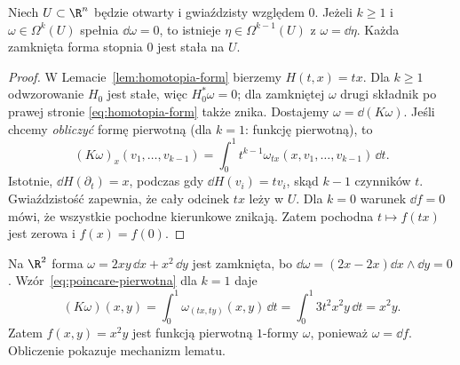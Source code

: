 \begin{twierdzenie}
\label{thm:lemat-poincare-formy}
Niech $U\subset\R^n$ będzie otwarty i gwiaździsty
względem $0$. Jeżeli $k\geq1$ i
$\omega\in\Omega^k(U)$ spełnia $\dd\omega=0$,
to istnieje $\eta\in\Omega^{k-1}(U)$ z
$\omega=\dd\eta$. Każda zamknięta forma stopnia
$0$ jest stała na $U$.
\end{twierdzenie}
\begin{proof}
W Lemacie~\ref{lem:homotopia-form} bierzemy
$H(t,x)=tx$. Dla $k\geq1$ odwzorowanie $H_0$
jest stałe, więc $H_0^*\omega=0$; dla zamkniętej
$\omega$ drugi składnik po prawej stronie
\eqref{eq:homotopia-form} także znika.
Dostajemy $\omega=\dd(K\omega)$.
Jeśli chcemy \emph{obliczyć} formę pierwotną
(dla $k=1$: funkcję pierwotną), to
\begin{equation}\label{eq:poincare-pierwotna}
 (K\omega)_x(v_1,\ldots,v_{k-1})
 =\int_0^1 t^{k-1}
   \omega_{tx}(x,v_1,\ldots,v_{k-1})\,\dd t.
\end{equation}
Istotnie, $\dd H(\partial_t)=x$, podczas gdy
$\dd H(v_i)=tv_i$, skąd $k-1$ czynników $t$.
Gwiaździstość zapewnia, że cały odcinek $tx$ leży w $U$.
Dla $k=0$ warunek $\dd f=0$ mówi, że wszystkie
pochodne kierunkowe znikają. Zatem pochodna
$t\mapsto f(tx)$ jest zerowa i $f(x)=f(0)$.
\end{proof}

\begin{przyklad}
Na $\R^2$ forma $\omega=2xy\,\dd x+x^2\,\dd y$
jest zamknięta, bo
$\dd\omega=(2x-2x)\dd x\wedge\dd y=0$.
Wzór~\eqref{eq:poincare-pierwotna} dla $k=1$ daje
\[
 (K\omega)(x,y)=\int_0^1
 \omega_{(tx,ty)}(x,y)\,\dd t
 =\int_0^1 3t^2x^2y\,\dd t=x^2y.
\]
Zatem $f(x,y)=x^2y$ jest funkcją pierwotną
$1$-formy $\omega$, ponieważ $\omega=\dd f$.
Obliczenie pokazuje mechanizm lematu.
\end{przyklad}

